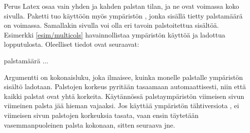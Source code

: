 Perus Latex osaa vain yhden ja kahden palstan tilan, ja ne ovat voimassa
koko sivulla. Paketti  tuo käyttöön myös
ympäristön , jonka sisällä tietty palstamäärä on
voimassa. Samallakin sivulla voi olla eri tavoin palstoitettua sisältöä.
Esimerkki \ref{esim/multicols} havainnollistaa ympäristön käyttöä ja
ladottua lopputulosta. Oleelliset tiedot ovat seuraavat:

\begin{koodilohkosis}
\begin{multicols}{palstamäärä}
  ...
\end{multicols}
\end{koodilohkosis}

\noindent
Argumentti  on kokonaisluku, joka ilmaisee, kuinka
monelle palstalle ympäristön sisältö ladotaan. Palstojen korkeus
pyritään tasaamaan automaattisesti, niin että kaikki palstat ovat yhtä
korkeita. Käytännössä palstaympäristön viimeisen sivun viimeinen palsta
jää hieman vajaaksi. Jos käyttää ympäristön tähtiversiota
, ei viimeisen sivun palstojen korkeuksia tasata,
vaan ensin täytetään vasemmanpuoleinen palsta kokonaan, sitten seuraava
jne.


